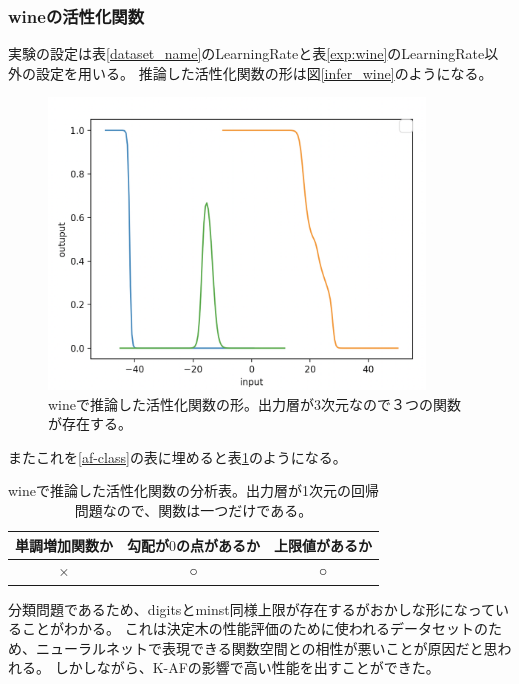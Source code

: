 \subsubsection{wineの活性化関数}
実験の設定は表\ref{dataset_name}のLearningRateと表\ref{exp:wine}のLearningRate以外の設定を用いる。
推論した活性化関数の形は図\ref{infer_wine}のようになる。
\begin{figure}[hbtp]
    \begin{center}
        \includegraphics[width=10cm]{asset/wine-0.01.png}
            \caption{wineで推論した活性化関数の形。出力層が3次元なので３つの関数が存在する。}
            \label{ifer_wine}
    \end{center}
\end{figure}

またこれを\ref{af-class}の表に埋めると表\ref{anal_wine}のようになる。
\begin{table}[htbp]
    \begin{center}
        \caption{wineで推論した活性化関数の分析表。出力層が1次元の回帰問題なので、関数は一つだけである。}
        \label{anal_wine}
        \vspace{2mm} 
        \begin{tabular}{ |c|c|c| }
        単調増加関数か & 勾配が$ 0 $の点があるか & 上限値があるか   \\
        \hline
        × & ○ & ○   \\
        \end{tabular}
    \end{center}
\end{table}


分類問題であるため、digitsとminst同様上限が存在するがおかしな形になっていることがわかる。
これは決定木の性能評価のために使われるデータセットのため、ニューラルネットで表現できる関数空間との相性が悪いことが原因だと思われる。
しかしながら、K-AFの影響で高い性能を出すことができた。







